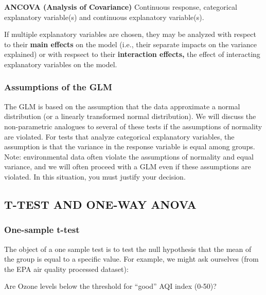 \documentclass[]{article}
\newenvironment{Shaded}{\begin{snugshade}}{\end{snugshade}}
\newcommand{\KeywordTok}[1]{\textcolor[rgb]{0.13,0.29,0.53}{\textbf{#1}}}
\newcommand{\OperatorTok}[1]{\textcolor[rgb]{0.81,0.36,0.00}{\textbf{#1}}}
\newcommand{\NormalTok}[1]{#1}
\begin{document}
\textbf{ANCOVA (Analysis of Covariance)} Continuous response,
categorical explanatory variable(s) and continuous explanatory
variable(s).

If multiple explanatory variables are chosen, they may be analyzed with
respect to their \textbf{main effects} on the model (i.e., their
separate impacts on the variance explained) or with respsect to their
\textbf{interaction effects,} the effect of interacting explanatory
variables on the model.

\subsubsection{Assumptions of the GLM}\label{assumptions-of-the-glm}

The GLM is based on the assumption that the data approximate a normal
distribution (or a linearly transformed normal distribution). We will
discuss the non-parametric analogues to several of these tests if the
assumptions of normality are violated. For tests that analyze
categorical explanatory variables, the assumption is that the variance
in the response variable is equal among groups. Note: environmental data
often violate the assumptions of normality and equal variance, and we
will often proceed with a GLM even if these assumptions are violated. In
this situation, you must justify your decision.

\subsection{T-TEST AND ONE-WAY ANOVA}\label{t-test-and-one-way-anova}

\subsubsection{One-sample t-test}\label{one-sample-t-test}

The object of a one sample test is to test the null hypothesis that the
mean of the group is equal to a specific value. For example, we might
ask ourselves (from the EPA air quality processed dataset):

Are Ozone levels below the threshold for ``good'' AQI index (0-50)?

\begin{Shaded}
\end{Shaded}
\end{document}
